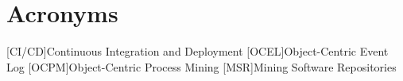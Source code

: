 \chapter{Acronyms}
\begin{acronym}
[CI/CD]{Continuous Integration and Deployment}
[OCEL]{Object-Centric Event Log}
[OCPM]{Object-Centric Process Mining}
[MSR]{Mining Software Repositories}
\end{acronym}